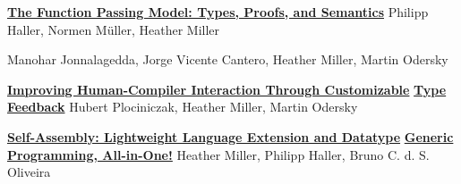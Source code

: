\documentclass[9pt]{article}
\begin{document}





{}
 \medskip


\noindent\href{https://infoscience.epfl.ch/record/221395}{\bf The Function Passing Model: Types, Proofs, and Semantics}
\newline\noindent Philipp Haller, Normen M\"{u}ller, Heather Miller
\medskip

\newline\noindent Manohar Jonnalagedda, Jorge Vicente Cantero, Heather Miller, Martin Odersky
\medskip

\noindent\href{https://infoscience.epfl.ch/record/197948}{\bf Improving Human-Compiler Interaction Through Customizable} \vspace{-0.03in}
\newline\noindent\href{https://infoscience.epfl.ch/record/197948}{\bf Type Feedback}\dates{}
\newline\noindent Hubert Plociniczak, Heather Miller, Martin Odersky
\medskip

\noindent\href{https://infoscience.epfl.ch/record/199389}{\bf Self-Assembly: Lightweight Language Extension and Datatype}\vspace{-0.03in}
\newline\noindent\href{https://infoscience.epfl.ch/record/199389}{\bf Generic Programming, All-in-One!}\dates{}
\newline\noindent Heather Miller, Philipp Haller, Bruno C. d. S. Oliveira
\medskip
\end{document}
